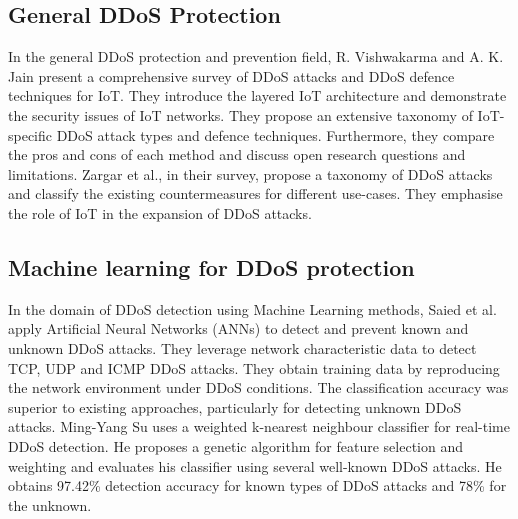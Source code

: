 \documentclass[conference]{IEEEtran}
\begin{document}
\subsection{General DDoS Protection}
In the general DDoS protection and prevention field, R. Vishwakarma and A. K. Jain present a comprehensive survey of DDoS attacks and DDoS defence techniques for IoT.
They introduce the layered IoT architecture and demonstrate the security issues of IoT networks.
They propose an extensive taxonomy of IoT-specific DDoS attack types and defence techniques.
Furthermore, they compare the pros and cons of each method and discuss open research questions and limitations. Zargar et al., in their survey, propose a taxonomy of DDoS attacks and classify the existing countermeasures for different use-cases.
They emphasise the role of IoT in the expansion of DDoS attacks.

\subsection{Machine learning for DDoS protection}
In the domain of DDoS detection using Machine Learning methods, Saied et al. apply Artificial Neural Networks (ANNs) to detect and prevent known and unknown DDoS attacks.
They leverage network characteristic data to detect TCP, UDP and ICMP DDoS attacks.
They obtain training data by reproducing the network environment under DDoS conditions.
The classification accuracy was superior to existing approaches, particularly for detecting unknown DDoS attacks.
Ming-Yang Su uses a weighted k-nearest neighbour classifier for real-time DDoS detection.
He proposes a genetic algorithm for feature selection and weighting and evaluates his classifier using several well-known DDoS attacks.
He obtains 97.42\% detection accuracy for known types of DDoS attacks and 78\% for the unknown.
\end{document}
